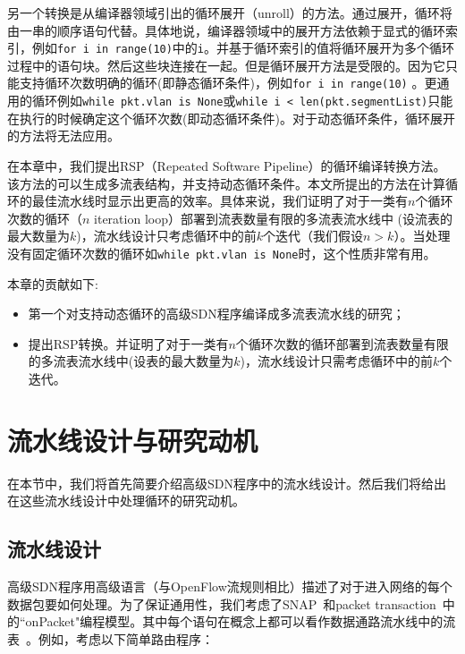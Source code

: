 \documentclass{ctexart}
\newcommand{\codeword}[1]{\texttt{\small{#1}}}
\begin{document}
另一个转换是从编译器领域引出的循环展开（unroll）的方法。通过展开，循环将由一串的顺序语句代替。具体地说，编译器领域中的展开方法依赖于显式的循环索引，例如\codeword{for i in range(10)}中的\codeword{i}。并基于循环索引的值将循环展开为多个循环过程中的语句块。然后这些块连接在一起。但是循环展开方法是受限的。因为它只能支持循环次数明确的循环(即静态循环条件)，例如\codeword{for i in range(10)} 。更通用的循环例如\codeword{while pkt.vlan is None}或\codeword{while i < len(pkt.segmentList)}只能在执行的时候确定这个循环次数(即动态循环条件)。对于动态循环条件，循环展开的方法将无法应用。

在本章中，我们提出RSP（Repeated Software Pipeline）的循环编译转换方法。该方法的可以生成多流表结构，并支持动态循环条件。本文所提出的方法在计算循环的最佳流水线时显示出更高的效率。具体来说，我们证明了对于一类有$n$个循环次数的循环（$n$ iteration loop）部署到流表数量有限的多流表流水线中 (设流表的最大数量为$k$)，流水线设计只考虑循环中的前$k$个迭代（我们假设$n > k$）。当处理没有固定循环次数的循环如\codeword{while pkt.vlan is None}时，这个性质非常有用。

本章的贡献如下:
\begin{itemize}
	\item 第一个对支持动态循环的高级SDN程序编译成多流表流水线的研究；
	\item 提出RSP转换。并证明了对于一类有$n$个循环次数的循环部署到流表数量有限的多流表流水线中(设表的最大数量为$k$)，流水线设计只需考虑循环中的前$k$个迭代。
\end{itemize}



\section{流水线设计与研究动机}
\label{sec:motivation}

在本节中，我们将首先简要介绍高级SDN程序中的流水线设计。然后我们将给出在这些流水线设计中处理循环的研究动机。

\subsection{流水线设计}
高级SDN程序用高级语言（与OpenFlow流规则相比）描述了对于进入网络的每个数据包要如何处理。为了保证通用性，我们考虑了SNAP~\cite{snap}和packet transaction~\cite{sivaraman2016packet}中的``onPacket"编程模型。其中每个语句在概念上都可以看作数据通路流水线中的流表~\cite{snap,sivaraman2016packet}。例如，考虑以下简单路由程序：
\end{document}

